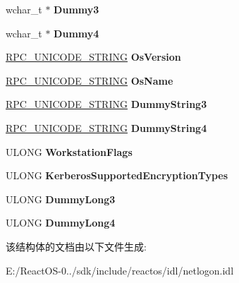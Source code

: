 \begin{DoxyCompactItemize}
wchar\+\_\+t $\ast$ {\bfseries Dummy3}
\item 
\mbox{\label{struct___n_e_t_l_o_g_o_n___w_o_r_k_s_t_a_t_i_o_n___i_n_f_o_a4a647cbf82008a728f6245450f01b693}} 
wchar\+\_\+t $\ast$ {\bfseries Dummy4}
\item 
\mbox{\label{struct___n_e_t_l_o_g_o_n___w_o_r_k_s_t_a_t_i_o_n___i_n_f_o_aa718b2c3869e3f236289ac9d0c516690}} 
\hyperlink{struct___r_p_c___u_n_i_c_o_d_e___s_t_r_i_n_g}{R\+P\+C\+\_\+\+U\+N\+I\+C\+O\+D\+E\+\_\+\+S\+T\+R\+I\+NG} {\bfseries Os\+Version}
\item 
\mbox{\label{struct___n_e_t_l_o_g_o_n___w_o_r_k_s_t_a_t_i_o_n___i_n_f_o_a60f81c38202d25fbe200e553c68aab39}} 
\hyperlink{struct___r_p_c___u_n_i_c_o_d_e___s_t_r_i_n_g}{R\+P\+C\+\_\+\+U\+N\+I\+C\+O\+D\+E\+\_\+\+S\+T\+R\+I\+NG} {\bfseries Os\+Name}
\item 
\mbox{\label{struct___n_e_t_l_o_g_o_n___w_o_r_k_s_t_a_t_i_o_n___i_n_f_o_ab9822eff552ce48d90aa3c2d48718566}} 
\hyperlink{struct___r_p_c___u_n_i_c_o_d_e___s_t_r_i_n_g}{R\+P\+C\+\_\+\+U\+N\+I\+C\+O\+D\+E\+\_\+\+S\+T\+R\+I\+NG} {\bfseries Dummy\+String3}
\item 
\mbox{\label{struct___n_e_t_l_o_g_o_n___w_o_r_k_s_t_a_t_i_o_n___i_n_f_o_abc5e5a11a1705c8a4157b5b981e781e3}} 
\hyperlink{struct___r_p_c___u_n_i_c_o_d_e___s_t_r_i_n_g}{R\+P\+C\+\_\+\+U\+N\+I\+C\+O\+D\+E\+\_\+\+S\+T\+R\+I\+NG} {\bfseries Dummy\+String4}
\item 
\mbox{\label{struct___n_e_t_l_o_g_o_n___w_o_r_k_s_t_a_t_i_o_n___i_n_f_o_a5a9a4b571d06c95298b3b3d6115624a3}} 
U\+L\+O\+NG {\bfseries Workstation\+Flags}
\item 
\mbox{\label{struct___n_e_t_l_o_g_o_n___w_o_r_k_s_t_a_t_i_o_n___i_n_f_o_aaaf16feb43078989d04267c9863ac8dd}} 
U\+L\+O\+NG {\bfseries Kerberos\+Supported\+Encryption\+Types}
\item 
\mbox{\label{struct___n_e_t_l_o_g_o_n___w_o_r_k_s_t_a_t_i_o_n___i_n_f_o_abf34eb0dde7fecb2017ad3303aac0b34}} 
U\+L\+O\+NG {\bfseries Dummy\+Long3}
\item 
\mbox{\label{struct___n_e_t_l_o_g_o_n___w_o_r_k_s_t_a_t_i_o_n___i_n_f_o_a9686a01477f473c43262665c6c9753d2}} 
U\+L\+O\+NG {\bfseries Dummy\+Long4}
\end{DoxyCompactItemize}


该结构体的文档由以下文件生成\+:\begin{DoxyCompactItemize}
\item 
E\+:/\+React\+O\+S-\/0../sdk/include/reactos/idl/netlogon.\+idl\end{DoxyCompactItemize}
